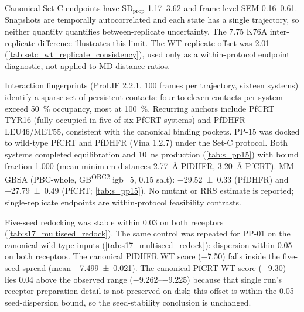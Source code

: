 \documentclass[journal=jcisd8,manuscript=suppinfo,layout=traditional]{achemso}
\begin{document}
Canonical Set-C endpoints have SD$_{\mathrm{prop}}$ \qtyrange{1.17}{3.62}{\kcalmol} and frame-level SEM \qtyrange{0.16}{0.61}{\kcalmol}. Snapshots are temporally autocorrelated and each state has a single trajectory, so neither quantity quantifies between-replicate uncertainty. The \qty{7.75}{\kcalmol} K76A inter-replicate difference illustrates this limit. The WT replicate offset was \qty{2.01}{\kcalmol} (\cref{tab:setc_wt_replicate_consistency}), used only as a within-protocol endpoint diagnostic, not applied to MD distance ratios.

Interaction fingerprints (ProLIF 2.2.1, \num{100} frames per trajectory, sixteen systems) identify a sparse set of persistent contacts: four to eleven contacts per system exceed \qty{50}{\percent} occupancy, most at \qty{100}{\percent}. Recurring anchors include PfCRT TYR16 (fully occupied in five of six PfCRT systems) and PfDHFR LEU46/MET55, consistent with the canonical binding pockets. PP-15 was docked to wild-type PfCRT and PfDHFR (Vina 1.2.7) under the Set-C protocol. Both systems completed equilibration and \qty{10}{\ns} production (\cref{tab:s_pp15}) with bound fraction \num{1.000} (mean minimum distances \qty{2.77}{\angstrom} PfDHFR, \qty{3.20}{\angstrom} PfCRT). MM-GBSA (PBC-whole, GB\textsuperscript{OBC2} igb=5, \qty{0.15}{\molar} salt): \qty{-29.52 \pm 0.33}{\kcalmol} (PfDHFR) and \qty{-27.79 \pm 0.49}{\kcalmol} (PfCRT; \cref{tab:s_pp15}). No mutant or RRS estimate is reported; single-replicate endpoints are within-protocol feasibility contrasts.

Five-seed redocking was stable within \qty{0.03}{\kcalmol} on both receptors (\cref{tab:s17_multiseed_redock}). The same control was repeated for PP-01 on the canonical wild-type inputs (\cref{tab:s17_multiseed_redock}): dispersion within \qty{0.05}{\kcalmol} on both receptors. The canonical PfDHFR WT score (\qty{-7.50}{\kcalmol}) falls inside the five-seed spread (mean \qty{-7.499 \pm 0.021}{\kcalmol}). The canonical PfCRT WT score (\qty{-9.30}{\kcalmol}) lies \qty{0.04}{\kcalmol} above the observed range (\qtyrange{-9.262}{-9.225}{\kcalmol}) because that single run's receptor-preparation detail is not preserved on disk; this offset is within the \qty{0.05}{\kcalmol} seed-dispersion bound, so the seed-stability conclusion is unchanged.
\end{document}
